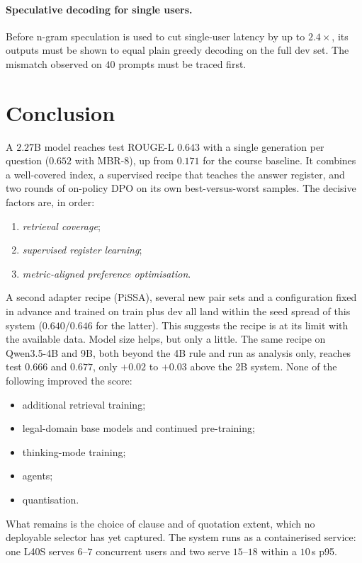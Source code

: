 \documentclass[11pt,a4paper]{article}
\newcommand{\rl}{ROUGE-L}
\begin{document}
\paragraph{Speculative decoding for single users.}
Before n-gram speculation is used to cut single-user latency by up to $2.4\times$, its outputs must be shown to equal plain greedy decoding on the full dev set. The mismatch observed on $40$ prompts must be traced first.

\section{Conclusion}
A $2.27$B model reaches test \rl{} $0.643$ with a single generation per question ($0.652$ with MBR-8), up from $0.171$ for the course baseline. It combines a well-covered index, a supervised recipe that teaches the answer register, and two rounds of on-policy DPO on its own best-versus-worst samples. The decisive factors are, in order:
\begin{enumerate}[leftmargin=*]
\item \emph{retrieval coverage};
\item \emph{supervised register learning};
\item \emph{metric-aligned preference optimisation}.
\end{enumerate}
A second adapter recipe (PiSSA), several new pair sets and a configuration fixed in advance and trained on train plus dev all land within the seed spread of this system ($0.640$/$0.646$ for the latter). This suggests the recipe is at its limit with the available data. Model size helps, but only a little. The same recipe on Qwen3.5-4B and 9B, both beyond the 4B rule and run as analysis only, reaches test $0.666$ and $0.677$, only $+0.02$ to $+0.03$ above the 2B system. None of the following improved the score:
\begin{itemize}[leftmargin=*]
\item additional retrieval training;
\item legal-domain base models and continued pre-training;
\item thinking-mode training;
\item agents;
\item quantisation.
\end{itemize}
What remains is the choice of clause and of quotation extent, which no deployable selector has yet captured. The system runs as a containerised service: one L40S serves $6$--$7$ concurrent users and two serve $15$--$18$ within a $10$\,s p95.
\end{document}
